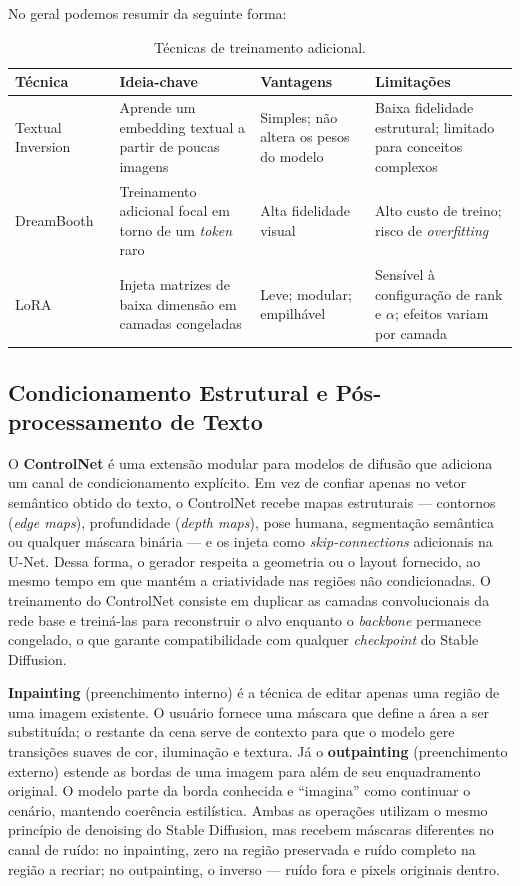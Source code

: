 \documentclass[12pt, %
openright, 
oneside, %
a4paper,    %
brazil]{facom-ufu-abntex2}
\begin{document}
No geral podemos resumir da seguinte forma:
\begin{table}[H]
    \centering
    \small
    \setlength{\tabcolsep}{4pt}
    \begin{tabularx}{\linewidth}{|X|X|X|X|}
    \hline
    \textbf{Técnica} & \textbf{Ideia-chave} & \textbf{Vantagens} & \textbf{Limitações} \\ \hline
    Textual Inversion~\cite{gal2022imageworthwordpersonalizing} & Aprende um embedding textual a partir de poucas imagens & Simples; não altera os pesos do modelo & Baixa fidelidade estrutural; limitado para conceitos complexos \\ \hline
    DreamBooth~\cite{ruiz2023dreamboothfinetuningtexttoimage} & Treinamento adicional focal em torno de um \textit{token} raro & Alta fidelidade visual & Alto custo de treino; risco de \textit{overfitting} \\ \hline
    LoRA~\cite{hu2021loralowrankadaptationlarge} & Injeta matrizes de baixa dimensão em camadas congeladas & Leve; modular; empilhável & Sensível à configuração de rank e \(\alpha\); efeitos variam por camada \\ \hline
    \end{tabularx}
    \caption{Técnicas de treinamento adicional.}
    \label{tab:tecnicas_personalizacao}
\end{table}

\subsection{Condicionamento Estrutural e Pós-processamento de Texto}

O \textbf{ControlNet} é uma extensão modular para modelos de difusão que adiciona um canal de condicionamento explícito. Em vez de confiar apenas no vetor semântico obtido do texto, o ControlNet recebe mapas estruturais — contornos (\emph{edge maps}), profundidade (\emph{depth maps}), pose humana, segmentação semântica ou qualquer máscara binária — e os injeta como \emph{skip-connections} adicionais na U-Net. Dessa forma, o gerador respeita a geometria ou o layout fornecido, ao mesmo tempo em que mantém a criatividade nas regiões não condicionadas. O treinamento do ControlNet consiste em duplicar as camadas convolucionais da rede base e treiná-las para reconstruir o alvo enquanto o \emph{backbone} permanece congelado, o que garante compatibilidade com qualquer \emph{checkpoint} do Stable Diffusion.

\textbf{Inpainting} (preenchimento interno) é a técnica de editar apenas uma região de uma imagem existente. O usuário fornece uma máscara que define a área a ser substituída; o restante da cena serve de contexto para que o modelo gere transições suaves de cor, iluminação e textura. Já o \textbf{outpainting} (preenchimento externo) estende as bordas de uma imagem para além de seu enquadramento original. O modelo parte da borda conhecida e ``imagina'' como continuar o cenário, mantendo coerência estilística. Ambas as operações utilizam o mesmo princípio de denoising do Stable Diffusion, mas recebem máscaras diferentes no canal de ruído: no inpainting, zero na região preservada e ruído completo na região a recriar; no outpainting, o inverso — ruído fora e pixels originais dentro.
\end{document}
